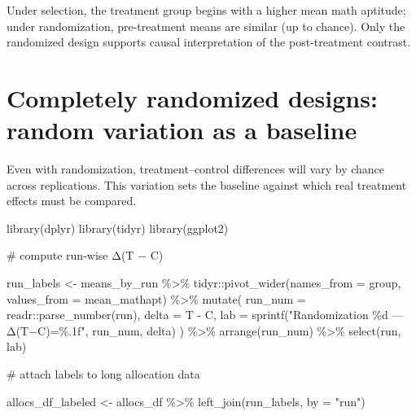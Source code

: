 \documentclass[
  letterpaper,
  DIV=11,
  numbers=noendperiod]{scrreprt}
\newenvironment{Shaded}{\begin{snugshade}}{\end{snugshade}}
\newcommand{\AttributeTok}[1]{\textcolor[rgb]{0.40,0.45,0.13}{#1}}
\newcommand{\CommentTok}[1]{\textcolor[rgb]{0.37,0.37,0.37}{#1}}
\newcommand{\FunctionTok}[1]{\textcolor[rgb]{0.28,0.35,0.67}{#1}}
\newcommand{\NormalTok}[1]{\textcolor[rgb]{0.00,0.23,0.31}{#1}}
\newcommand{\OtherTok}[1]{\textcolor[rgb]{0.00,0.23,0.31}{#1}}
\newcommand{\SpecialCharTok}[1]{\textcolor[rgb]{0.37,0.37,0.37}{#1}}
\newcommand{\StringTok}[1]{\textcolor[rgb]{0.13,0.47,0.30}{#1}}
\begin{document}
Under selection, the treatment group begins with a higher mean math
aptitude; under randomization, pre-treatment means are similar (up to
chance). Only the randomized design supports causal interpretation of
the post-treatment contrast.

\section{Completely randomized designs: random variation as a
baseline}\label{completely-randomized-designs-random-variation-as-a-baseline}

Even with randomization, treatment--control differences will vary by
chance across replications. This variation sets the baseline against
which real treatment effects must be compared.

\begin{Shaded}
\begin{Highlighting}[]
\FunctionTok{library}\NormalTok{(dplyr)}
\FunctionTok{library}\NormalTok{(tidyr)}
\FunctionTok{library}\NormalTok{(ggplot2)}

\CommentTok{\# compute run{-}wise Δ(T − C)}

\NormalTok{run\_labels }\OtherTok{\textless{}{-}}\NormalTok{ means\_by\_run }\SpecialCharTok{\%\textgreater{}\%}
\NormalTok{tidyr}\SpecialCharTok{::}\FunctionTok{pivot\_wider}\NormalTok{(}\AttributeTok{names\_from =}\NormalTok{ group, }\AttributeTok{values\_from =}\NormalTok{ mean\_mathapt) }\SpecialCharTok{\%\textgreater{}\%}
\FunctionTok{mutate}\NormalTok{(}
\AttributeTok{run\_num =}\NormalTok{ readr}\SpecialCharTok{::}\FunctionTok{parse\_number}\NormalTok{(run),}
\AttributeTok{delta   =} \StringTok{\textasciigrave{}}\AttributeTok{T}\StringTok{\textasciigrave{}} \SpecialCharTok{{-}}\NormalTok{ C,}
\AttributeTok{lab     =} \FunctionTok{sprintf}\NormalTok{(}\StringTok{"Randomization \%d — Δ(T−C)=\%.1f"}\NormalTok{, run\_num, delta)}
\NormalTok{) }\SpecialCharTok{\%\textgreater{}\%}
\FunctionTok{arrange}\NormalTok{(run\_num) }\SpecialCharTok{\%\textgreater{}\%}
\FunctionTok{select}\NormalTok{(run, lab)}

\CommentTok{\# attach labels to long allocation data}

\NormalTok{allocs\_df\_labeled }\OtherTok{\textless{}{-}}\NormalTok{ allocs\_df }\SpecialCharTok{\%\textgreater{}\%}
\FunctionTok{left\_join}\NormalTok{(run\_labels, }\AttributeTok{by =} \StringTok{"run"}\NormalTok{)}


\end{Highlighting}
\end{Shaded}
\end{document}
